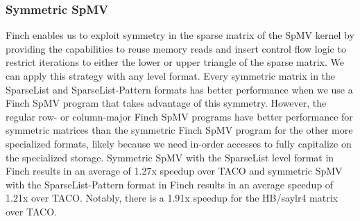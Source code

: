 \subsubsection{Symmetric SpMV}
Finch enables us to exploit symmetry in the sparse matrix of the SpMV kernel by providing the capabilities to reuse memory reads and insert control flow logic to restrict iterations to either the lower or upper triangle of the sparse matrix. We can apply this strategy with any level format. Every symmetric matrix in the SparseList and SparseList-Pattern formats has better performance when we use a Finch SpMV program that takes advantage of this symmetry. However, the regular row- or column-major Finch SpMV programs have better performance for symmetric matrices than the symmetric Finch SpMV program for the other more specialized formats, likely because we need in-order accesses to fully capitalize on the specialized storage. Symmetric SpMV with the SparseList level format in Finch results in an average of 1.27x speedup over TACO and symmetric SpMV with the SparseList-Pattern format in Finch results in an average speedup of 1.21x over TACO. Notably, there is a 1.91x speedup for the HB/saylr4 matrix over TACO. 



